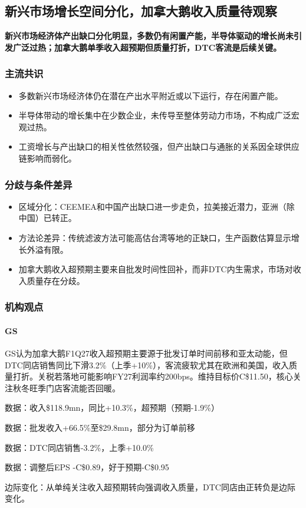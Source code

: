 \documentclass[11pt]{ctexart}
\begin{document}
\subsection{新兴市场增长空间分化，加拿大鹅收入质量待观察}
\textbf{新兴市场经济体产出缺口分化明显，多数仍有闲置产能，半导体驱动的增长尚未引发广泛过热；加拿大鹅单季收入超预期但质量打折，DTC客流是后续关键。}
\subsubsection*{主流共识}
\begin{itemize}
  \item 多数新兴市场经济体仍在潜在产出水平附近或以下运行，存在闲置产能。
  \item 半导体带动的增长集中在少数企业，未传导至整体劳动力市场，不构成广泛宏观过热。
  \item 工资增长与产出缺口的相关性依然较强，但产出缺口与通胀的关系因全球供应链影响而弱化。
\end{itemize}
\subsubsection*{分歧与条件差异}
\begin{itemize}
  \item 区域分化：CEEMEA和中国产出缺口进一步走负，拉美接近潜力，亚洲（除中国）已转正。
  \item 方法论差异：传统滤波方法可能高估台湾等地的正缺口，生产函数估算显示增长外溢有限。
  \item 加拿大鹅收入超预期主要来自批发时间性回补，而非DTC内生需求，市场对收入质量存在分歧。
\end{itemize}
\subsubsection*{机构观点}
\paragraph{GS} GS认为加拿大鹅F1Q27收入超预期主要源于批发订单时间前移和亚太动能，但DTC同店销售同比下滑3.2\%（上季+10\%），客流疲软尤其在欧洲和美国，收入质量打折。关税若落地可能影响FY27利润率约200bps。维持目标价C\$11.50，核心关注秋冬旺季门店客流能否回暖。
{\small\color{refgray}数据：收入\$118.9mn，同比+10.3\%，超预期（预期-1.9\%）\par}
{\small\color{refgray}数据：批发收入+66.5\%至\$29.8mn，部分为订单前移\par}
{\small\color{refgray}数据：DTC同店销售-3.2\%，上季+10.0\%\par}
{\small\color{refgray}数据：调整后EPS -C\$0.89，好于预期-C\$0.95\par}
{\small\color{refgray}边际变化：从单纯关注收入超预期转向强调收入质量，DTC同店由正转负是边际变化。\par}
\end{document}
